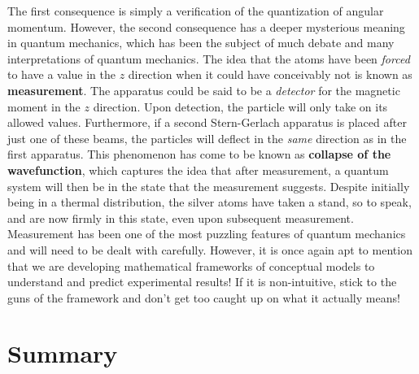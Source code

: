 The first consequence is simply a verification of the quantization of angular momentum. However, the second consequence has a deeper mysterious meaning in quantum mechanics, which has been the subject of much debate and many interpretations of quantum mechanics. The idea that the atoms have been \textit{forced} to have a value in the $z$ direction when it could have conceivably not is known as \textbf{measurement}. The apparatus could be said to be a \textit{detector} for the magnetic moment in the $z$ direction. Upon detection, the particle will only take on its allowed values. Furthermore, if a second Stern-Gerlach apparatus is placed after just one of these beams, the particles will deflect in the \textit{same} direction as in the first apparatus. This phenomenon has come to be known as \textbf{collapse of the wavefunction}, which captures the idea that after measurement, a quantum system will then be in the state that the measurement suggests. Despite initially being in a thermal distribution, the silver atoms have taken a stand, so to speak, and are now firmly in this state, even upon subsequent measurement. Measurement has been one of the most puzzling features of quantum mechanics and will need to be dealt with carefully. However, it is once again apt to mention that we are developing mathematical frameworks of conceptual models to understand and predict experimental results! If it is non-intuitive, stick to the guns of the framework and don't get too caught up on what it actually means! 
\section{Summary}

